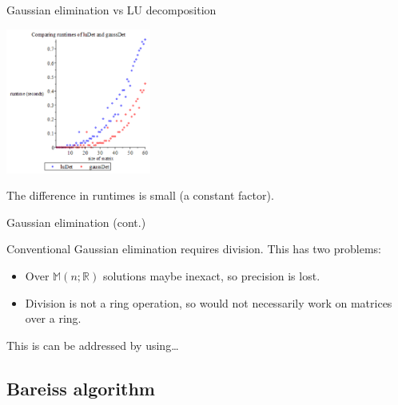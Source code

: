 \documentclass{beamer}
\begin{document}
\begin{frame}{Gaussian elimination vs LU decomposition}

    \begin{center}{}
        \includegraphics[height=180]{lu-gauss}
    \end{center}

    The difference in runtimes is small (a constant factor).

\end{frame}

\begin{frame}{Gaussian elimination (cont.)}


    Conventional Gaussian elimination requires division.
    This has two problems:
    \begin{itemize}
        \item Over $\mathbb{M}(n; \mathbb{R})$ solutions maybe inexact, so precision is lost.
        \item Division is not a ring operation,
            so would not necessarily work on matrices over a ring.
    \end{itemize}

    This is can be addressed by using\dots

\end{frame}

\subsection{Bareiss algorithm}
\end{document}
